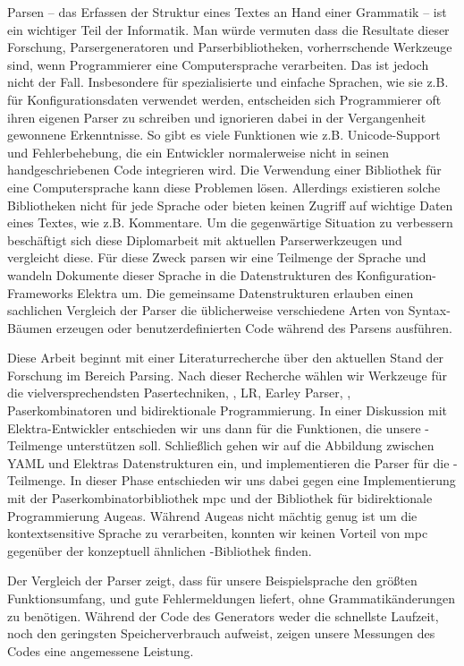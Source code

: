 \begin{kurzfassung}
Parsen – das Erfassen der Struktur eines Textes an Hand einer Grammatik – ist ein wichtiger Teil der Informatik. Man würde vermuten dass die Resultate dieser Forschung, Parsergeneratoren und Parserbibliotheken, vorherrschende Werkzeuge sind, wenn Programmierer eine Computersprache verarbeiten. Das ist jedoch nicht der Fall. Insbesondere für spezialisierte und einfache Sprachen, wie sie z.B. für Konfigurationsdaten verwendet werden, entscheiden sich Programmierer oft ihren eigenen Parser zu schreiben und ignorieren dabei in der Vergangenheit gewonnene Erkenntnisse. So gibt es viele Funktionen wie z.B. Unicode-Support und Fehlerbehebung, die ein Entwickler normalerweise nicht in seinen handgeschriebenen Code integrieren wird. Die Verwendung einer Bibliothek für eine Computersprache kann diese Problemen lösen. Allerdings existieren solche Bibliotheken nicht für jede Sprache oder bieten keinen Zugriff auf wichtige Daten eines Textes, wie z.B. Kommentare. Um die gegenwärtige Situation zu verbessern beschäftigt sich diese Diplomarbeit mit aktuellen Parserwerkzeugen und vergleicht diese. Für diese Zweck parsen wir eine Teilmenge der Sprache  und wandeln Dokumente dieser Sprache in die Datenstrukturen des Konfiguration-Frameworks Elektra um. Die gemeinsame Datenstrukturen erlauben einen sachlichen Vergleich der Parser die üblicherweise verschiedene Arten von Syntax-Bäumen erzeugen oder benutzerdefinierten Code während des Parsens ausführen.

Diese Arbeit beginnt mit einer Literaturrecherche über den aktuellen Stand der Forschung im Bereich Parsing. Nach dieser Recherche wählen wir Werkzeuge für die vielversprechendsten Pasertechniken, , LR, Earley Parser, , Paserkombinatoren und bidirektionale Programmierung. In einer Diskussion mit Elektra-Entwickler entschieden wir uns dann für die Funktionen, die unsere -Teilmenge unterstützen soll. Schließlich gehen wir auf die Abbildung zwischen YAML und Elektras Datenstrukturen ein, und implementieren die Parser für die -Teilmenge. In dieser Phase entschieden wir uns dabei gegen eine Implementierung mit der Paserkombinatorbibliothek mpc und der Bibliothek für bidirektionale Programmierung Augeas. Während Augeas nicht mächtig genug ist um die kontextsensitive Sprache  zu verarbeiten, konnten wir keinen Vorteil von mpc gegenüber der konzeptuell ähnlichen -Bibliothek  finden.

Der Vergleich der Parser zeigt, dass für unsere Beispielsprache  den größten Funktionsumfang, und gute Fehlermeldungen liefert, ohne Grammatikänderungen zu benötigen. Während der Code des Generators weder die schnellste Laufzeit, noch den geringsten Speicherverbrauch aufweist, zeigen unsere Messungen des Codes eine angemessene Leistung.
\end{kurzfassung}
